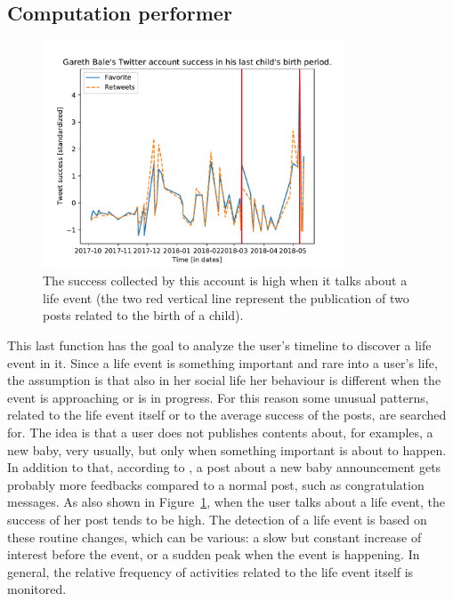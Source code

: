 \subsection{Computation performer}
\label{sec:computationperformer}

\begin{figure}
\centering
\includegraphics[width=%
0.8\textwidth]{img/bale}
\caption{The success collected by this account is high when it talks about a life event (the two red vertical line represent the publication of two posts related to the birth of a child).}
\label{fig:bale}
\end{figure}

This last function has the goal to analyze the user's timeline to discover a life event in it. Since a life event is something important and rare into a user's life, the assumption is that also in her social life her behaviour is different when the event is approaching or is in progress. For this reason some unusual patterns, related to the life event itself or to the average success of the posts, are searched for. The idea is that a user does not publishes contents about, for examples, a new baby, very usually, but only when something important is about to happen. In addition to that, according to \cite{dickinson2015identifying}, a post about a new baby announcement gets probably more feedbacks compared to a normal post, such as congratulation messages. As also shown in Figure~\ref{fig:bale}, when the user talks about a life event, the success of her post tends to be high. The detection of a life event is based on these routine changes, which can be various: a slow but constant increase of interest before the event, or a sudden peak when the event is happening. In general, the relative frequency of activities related to the life event itself is monitored.

